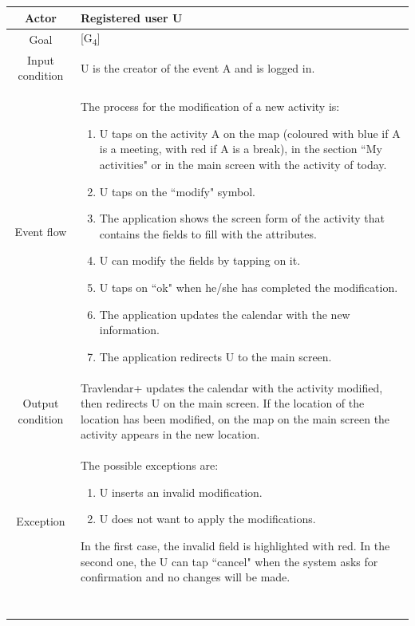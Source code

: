 \documentclass[12pt,titlepage]{article}
\begin{document}
\begin{tabular}{cp{10cm}} 
Actor&Registered user U \\ \hline 
Goal& {[G\textsubscript{4}]}\\ \hline
Input condition&U is the creator of the event A and is logged in.\\ \hline
Event flow&The process for the modification of a new activity is: \begin{enumerate}
\item U taps on the activity A on the map (coloured with blue if A is a meeting, with red if A is a break), in the section ``My activities" or in the main screen with the activity of today.
\item U taps on the ``modify" symbol.
\item The application shows the screen form of the activity that contains the fields to fill with the attributes.
\item U can modify the fields by tapping on it.
\item U taps on ``ok" when he/she has completed the modification.
\item The application updates the calendar with the new information.
\item The application redirects U to the main screen. 
\end{enumerate} \\ \hline
Output condition& Travlendar+ updates the calendar with the activity modified, then redirects U on the main screen. If the location of the location has been modified, on the map on the main screen the activity appears in the new location.
\\ \hline
Exception& The possible exceptions are:
\begin{enumerate}
\item U inserts an invalid modification.
\item U does not want to apply the modifications.
\end{enumerate} 
In the first case, the invalid field is highlighted with red. In the second one, the U can tap ``cancel" when the system asks for confirmation and no changes will be made.
\\ \hline \

\end{tabular}
\end{document}
